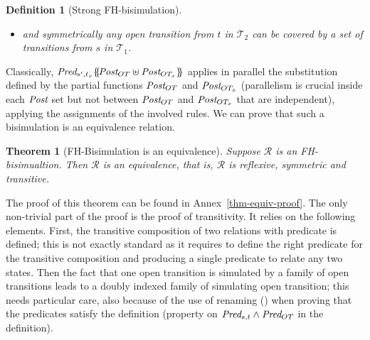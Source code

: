 \documentclass{lmcs}
\newcommand{\TODO}[1]{\textcolor{red}{\textbf{[TODO:#1]}}}
\newtheorem{theorem}{Theorem}
\newtheorem{definition}{Definition}
\begin{document}
\begin{definition}[Strong FH-bisimulation]
\begin{itemize}
     
 \item  and symmetrically any open transition from $t$ in $\mathcal{T}_2$ can be 
      covered by a set of transitions from $s$ in $\mathcal{T}_1$.
 \end{itemize}

 

 \end{definition}
Classically, $\Pred_{s',t_x}\subst{\Post_{OT}\uplus\Post_{OT_x}}$
applies in parallel the  
substitution defined by the partial functions $\Post_{OT}$ and $\Post_{OT_x}$ (parallelism is crucial
inside each $\Post$ set but not between  $\Post_{OT}$ and
$\Post_{OT_x}$ that are independent), applying the assignments of the involved rules.
We can prove that such a bisimulation is an equivalence relation.




\begin{theorem}[FH-Bisimulation is an equivalence]\label{thm-equiv} Suppose $\mathcal{R}$ 
is an FH-bisimualtion. Then $\mathcal{R}$ is an equivalence, that is, $\mathcal{R}$ is 
reflexive, symmetric and transitive.
\end{theorem}

The proof of this theorem can be found in Annex~\ref{thm-equiv-proof}. The
only non-trivial part of the proof is the proof of transitivity. It
relies on the following elements. First,  the transitive composition
of two relations with predicate is defined; this is not exactly
standard as it requires to define the right predicate for the
transitive composition and producing a single predicate to relate any
two states. Then the fact that one open transition is simulated by a
family of open transitions leads to a doubly indexed family of
simulating open transition; this needs particular care, also because
of the use of renaming (\Post) when proving that the predicates
satisfy the definition (property on $\Pred_{s,t} \land \Pred_{OT}$ in
the definition).  


\medskip
\end{document}
